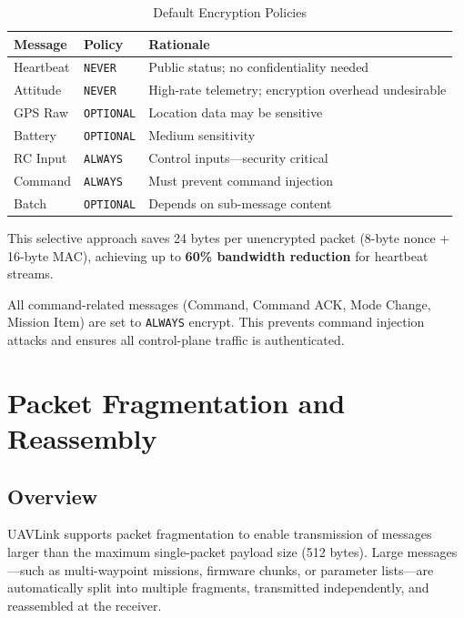 \documentclass[11pt,a4paper]{article}
\begin{document}
\begin{table}[H]
\centering
\caption{Default Encryption Policies}
\begin{tabular}{@{}lll@{}}
\toprule
\textbf{Message} & \textbf{Policy} & \textbf{Rationale} \\
\midrule
Heartbeat  & \texttt{NEVER}    & Public status; no confidentiality needed \\
Attitude   & \texttt{NEVER}    & High-rate telemetry; encryption overhead undesirable \\
GPS Raw    & \texttt{OPTIONAL} & Location data may be sensitive \\
Battery    & \texttt{OPTIONAL} & Medium sensitivity \\
RC Input   & \texttt{ALWAYS}   & Control inputs---security critical \\
Command    & \texttt{ALWAYS}   & Must prevent command injection \\
Batch      & \texttt{OPTIONAL} & Depends on sub-message content \\
\bottomrule
\end{tabular}
\end{table}

This selective approach saves 24 bytes per unencrypted packet (8-byte nonce + 16-byte MAC), achieving up to \textbf{60\% bandwidth reduction} for heartbeat streams.

\begin{notebox}
All command-related messages (Command, Command ACK, Mode Change, Mission Item) are set to \texttt{ALWAYS} encrypt. This prevents command injection attacks and ensures all control-plane traffic is authenticated.
\end{notebox}

\section{Packet Fragmentation and Reassembly}

\subsection{Overview}

UAVLink supports packet fragmentation to enable transmission of messages larger than the maximum single-packet payload size (512 bytes). Large messages---such as multi-waypoint missions, firmware chunks, or parameter lists---are automatically split into multiple fragments, transmitted independently, and reassembled at the receiver.
\end{document}
